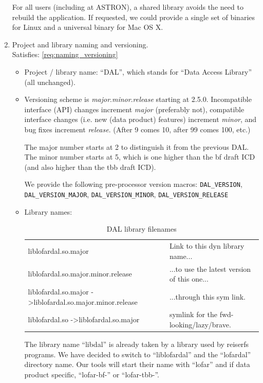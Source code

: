 \documentclass[a4paper,11pt]{article}
\begin{document}
\begin{enumerate}[resume, label=\it D.\arabic{*}]
For all users (including at ASTRON), a shared library avoids the need to rebuild the application.
If requested, we could provide a single set of binaries for Linux and a universal binary for Mac OS X.


\item \label{dsg:naming_versioning} Project and library naming and versioning.\\
Satisfies: \ref{req:naming_versioning}\\

\begin{itemize}
\itemsep0em
\item Project / library name: ``DAL'', which stands for ``Data Access Library'' (all unchanged).
\item Versioning scheme is \textit{major}.\textit{minor}.\textit{release} starting at 2.5.0.
Incompatible interface (API) changes increment \textit{major} (preferably not), compatible interface changes (i.e. new (data product) features) increment \textit{minor}, and bug fixes increment \textit{release}. (After 9 comes 10, after 99 comes 100, etc.)

The major number starts at 2 to distinguish it from the previous DAL.
The minor number starts at 5, which is one higher than the bf draft ICD (and also higher than the tbb draft ICD).

We provide the following pre-processor version macros: \texttt{DAL\_VERSION}, \texttt{DAL\_VERSION\_MAJOR}, \texttt{DAL\_VERSION\_MINOR}, \texttt{DAL\_VERSION\_RELEASE}
\item Library names:

\begin{table}[htb!]
\label{tab:lib_names}
\centering
\begin{tabular}{ll}
liblofardal.so.major				& Link to this dyn library name...\\
liblofardal.so.major.minor.release	& ...to use the latest version of this one...\\
liblofardal.so.major -\textgreater liblofardal.so.major.minor.release	& ...through this sym link.\\
liblofardal.so -\textgreater liblofardal.so.major	& symlink for the fwd-looking/lazy/brave.\\
\end{tabular}
\caption{DAL library filenames}
\end{table}

The library name ``libdal'' is already taken by a library used by reiserfs programs.
We have decided to switch to ``liblofardal'' and the ``lofardal'' directory name.
Our tools will start their name with ``lofar'' and if data product specific, ``lofar-bf-'' or ``lofar-tbb-''.

\end{itemize}

\end{enumerate}
\end{document}
